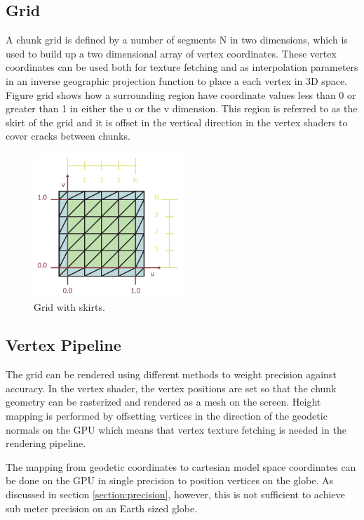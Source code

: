 \subsection{Grid}

A chunk grid is defined by a number of segments N in two dimensions, which is used to build up a two dimensional array of vertex coordinates. These vertex coordinates can be used both for texture fetching and as interpolation parameters in an inverse geographic projection function to place a each vertex in 3D space. Figure grid shows how a surrounding region have coordinate values less than 0 or greater than 1 in either the u or the v dimension. This region is referred to as the skirt of the grid and it is offset in the vertical direction in the vertex shaders to cover cracks between chunks.

\begin{figure}[htbp]
    \centering
    \includegraphics[width=0.5\textwidth]{figures/implementation/rendering/grid.pdf}
    \caption{Grid with skirts.}
    \label{fig:grid}
\end{figure}

\subsection{Vertex Pipeline}

The grid can be rendered using different methods to weight precision against accuracy. In the vertex shader, the vertex positions are set so that the chunk geometry can be rasterized and rendered as a mesh on the screen. Height mapping is performed by offsetting vertices in the direction of the geodetic normals on the GPU which means that vertex texture fetching is needed in the rendering pipeline.

The mapping from geodetic coordinates to cartesian model space coordinates can be done on the GPU in single precision to position vertices on the globe. As discussed in section \ref{section:precision}, however, this is not sufficient to achieve sub meter precision on an Earth sized globe.

